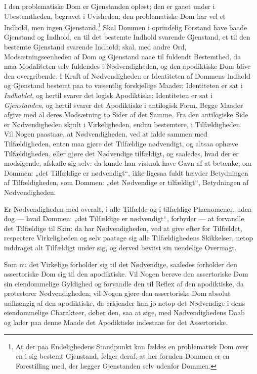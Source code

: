 \documentclass[12pt]{book}
\newcommand{\opage}[1]{\marginnote{\footnotesize\textit{[#1]}}}
\begin{document}
I den problematiske Dom er Gjenstanden opløst; den er
gaaet under i Ubestemtheden, begravet i Uvisheden; den problematiske
Dom har vel et Indhold, men ingen Gjenstand.\footnote{At der paa Endelighedens Standpunkt kan fældes en problematisk
Dom over en i sig bestemt Gjenstand, følger deraf, at her foruden
Dommen er en Forestilling med, der lægger Gjenstanden selv udenfor
Dommen.}%
Skal Dommen i oprindelig Forstand have baade Gjenstand
og Indhold, en til det bestemte Indhold svarende Gjenstand,
et til den bestemte Gjenstand svarende Indhold; skal, med
\opage{290}andre Ord, Modsætningseenheden af Dom og Gjenstand naae
til fuldendt Bestemthed, da maa Modaliteten selv fuldendes
i Nødvendigheden, og den apodiktiske Dom blive den overgribende.
I Kraft af Nødvendigheden er Identiteten af Dommens
Indhold og Gjenstand bestemt paa to væsentlig forskjellige
Maader: Identiteten er sat i \emph{Indholdet}, og hertil
svarer det logisk Apodiktiske; Identiteten er sat i \emph{Gjenstanden},
og hertil svarer det Apodiktiske i antilogisk Form. Begge
Maader afgive med al deres Modsætning to Sider af det
Samme. Fra den antilogiske Side er Nødvendigheden skjult
i Virkeligheden, endnu bestemtere, i Tilfældigheden. Vil
Nogen paastaae, at Nødvendigheden, ved at falde sammen med
Tilfældigheden, enten maa gjøre det Tilfældige nødvendigt, og
altsaa ophæve Tilfældigheden, eller gjøre det Nødvendige tilfældigt,
og saaledes, hvad der er modsigende, afskaffe sig selv:
da kunde han vistnok have Gavn af at betænke, om Dommen:
„det Tilfældige er nødvendigt“, ikke ligesaa fuldt
hævder Betydningen af Tilfældigheden, som Dommen: „det
Nødvendige er tilfældigt“, Betydningen af Nødvendigheden.

Er Nødvendigheden med overalt, i alle Tilfælde og i tilfældige
Phænomener, uden dog --- hvad Dommen: „det Tilfældige
er nødvendigt“, forbyder --- at forvandle det Tilfældige
til Skin: da har Nødvendigheden, ved at give efter for Tilfældet,
respectere Virkeligheden og selv paatage sig alle Tilfældighedens
Skikkelser, netop inddraget alt Tilfældigt under
sig, og derved beviist sin uendelige Overmagt.

Som nu det Virkelige forholder sig til det Nødvendige,
saaledes forholder den assertoriske Dom sig til den apodiktiske.
Vil Nogen berøve den assertoriske Dom sin eiendommelige
Gyldighed og forvandle den til Reflex af den apodiktiske, da
protesterer Nødvendigheden; vil Nogen gjøre den assertoriske
Dom absolut uafhængig af den apodiktiske, da erkjender han
jo netop det Nødvendige i dens eiendommelige Charakteer,
døber den, saa at sige, med Nødvendighedens Daab og
\opage{291}lader paa denne Maade det Apodiktiske indestaae for det
Assertoriske.
\end{document}
